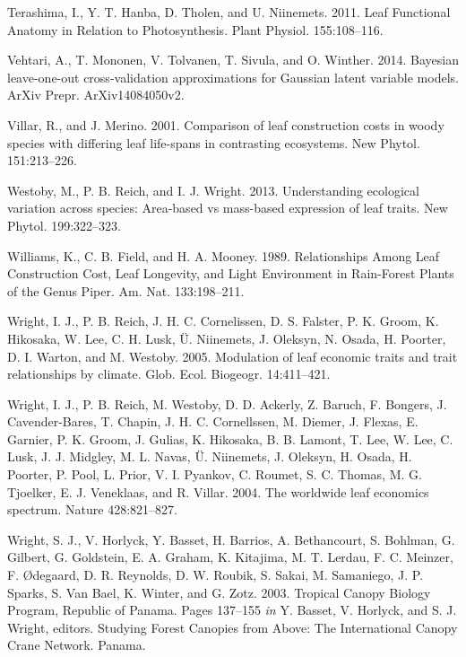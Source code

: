 \documentclass[
  12pt,
]{article}
\newlength{\cslhangindent}
\newenvironment{cslreferences}%
  {\setlength{\parindent}{0pt}%
  \everypar{\setlength{\hangindent}{\cslhangindent}}\ignorespaces}%
  {\par}
\begin{document}
\begin{cslreferences}
\leavevmode\hypertarget{ref-Terashima2011}{}%
Terashima, I., Y. T. Hanba, D. Tholen, and U. Niinemets. 2011. Leaf Functional Anatomy in Relation to Photosynthesis. Plant Physiol. 155:108--116.

\leavevmode\hypertarget{ref-Vehtari2014}{}%
Vehtari, A., T. Mononen, V. Tolvanen, T. Sivula, and O. Winther. 2014. Bayesian leave-one-out cross-validation approximations for Gaussian latent variable models. ArXiv Prepr. ArXiv14084050v2.

\leavevmode\hypertarget{ref-Villar2001}{}%
Villar, R., and J. Merino. 2001. Comparison of leaf construction costs in woody species with differing leaf life-spans in contrasting ecosystems. New Phytol. 151:213--226.

\leavevmode\hypertarget{ref-Westoby2013}{}%
Westoby, M., P. B. Reich, and I. J. Wright. 2013. Understanding ecological variation across species: Area-based vs mass-based expression of leaf traits. New Phytol. 199:322--323.

\leavevmode\hypertarget{ref-Williams1989}{}%
Williams, K., C. B. Field, and H. A. Mooney. 1989. Relationships Among Leaf Construction Cost, Leaf Longevity, and Light Environment in Rain-Forest Plants of the Genus Piper. Am. Nat. 133:198--211.

\leavevmode\hypertarget{ref-Wright2005}{}%
Wright, I. J., P. B. Reich, J. H. C. Cornelissen, D. S. Falster, P. K. Groom, K. Hikosaka, W. Lee, C. H. Lusk, Ü. Niinemets, J. Oleksyn, N. Osada, H. Poorter, D. I. Warton, and M. Westoby. 2005. Modulation of leaf economic traits and trait relationships by climate. Glob. Ecol. Biogeogr. 14:411--421.

\leavevmode\hypertarget{ref-Wright2004a}{}%
Wright, I. J., P. B. Reich, M. Westoby, D. D. Ackerly, Z. Baruch, F. Bongers, J. Cavender-Bares, T. Chapin, J. H. C. Cornellssen, M. Diemer, J. Flexas, E. Garnier, P. K. Groom, J. Gulias, K. Hikosaka, B. B. Lamont, T. Lee, W. Lee, C. Lusk, J. J. Midgley, M. L. Navas, Ü. Niinemets, J. Oleksyn, H. Osada, H. Poorter, P. Pool, L. Prior, V. I. Pyankov, C. Roumet, S. C. Thomas, M. G. Tjoelker, E. J. Veneklaas, and R. Villar. 2004. The worldwide leaf economics spectrum. Nature 428:821--827.

\leavevmode\hypertarget{ref-Wright2003}{}%
Wright, S. J., V. Horlyck, Y. Basset, H. Barrios, A. Bethancourt, S. Bohlman, G. Gilbert, G. Goldstein, E. A. Graham, K. Kitajima, M. T. Lerdau, F. C. Meinzer, F. Ødegaard, D. R. Reynolds, D. W. Roubik, S. Sakai, M. Samaniego, J. P. Sparks, S. Van Bael, K. Winter, and G. Zotz. 2003. Tropical Canopy Biology Program, Republic of Panama. Pages 137--155 \emph{in} Y. Basset, V. Horlyck, and S. J. Wright, editors. Studying Forest Canopies from Above: The International Canopy Crane Network. Panama.


\end{cslreferences}
\end{document}
